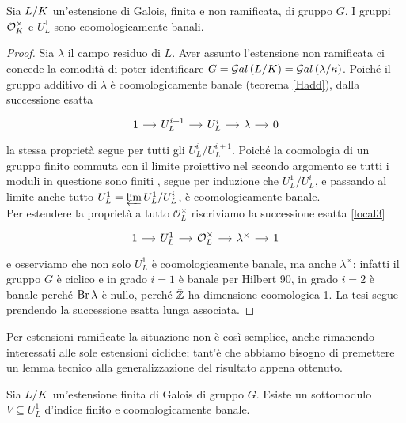 \begin{theorem}
	Sia $ L/K $ un'estensione di Galois, finita e non ramificata, di gruppo $ G $. I gruppi $ \mathcal{O}_{K}^\times $ e $ U_L^1 $ sono coomologicamente banali.
\end{theorem}
\begin{proof}
	Sia $ \lambda $ il campo residuo di $ L $. Aver assunto l'estensione non ramificata ci concede la comodità di poter identificare $ G = \mathcal{G}al\left( L/K \right) = \mathcal{G}al\left( \lambda / \kappa \right) $. Poiché il gruppo additivo di $ \lambda $ è coomologicamente banale (teorema \ref{Hadd}), dalla successione esatta
	\[\begin{tikzcd}[column sep = small]
	1 \rar
	& U_L^{i+1} \rar
	& U_{L}^i \rar
	& \lambda \rar
	& 0
	\end{tikzcd}\]
	la stessa proprietà segue per tutti gli $ U^i_{L} / U^{i+1}_{L} $.
	Poiché la coomologia di un gruppo finito commuta con il limite proiettivo nel secondo argomento se tutti i moduli in questione sono finiti \cite[proposizione 1.12]{Harari}, segue per induzione che $ U^1_{L} / U^{i}_{L} $, e passando al limite anche tutto $ U^1_L = \varprojlim U^1_{L} / U^{i}_{L} $, è coomologicamente banale. \\
	
	Per estendere la proprietà a tutto $ \mathcal{O}_{L}^\times $ riscriviamo la successione esatta \eqref{local3}
	\begin{equation*}
	\begin{tikzcd}[column sep = small]
	1 \rar
	& U_L^{1} \rar
	& \mathcal{O}_{L}^\times \rar
	& \lambda^\times \rar
	&1
	\end{tikzcd}
	\end{equation*}
	e osserviamo che non solo $  U^1_L $ è coomologicamente banale, ma anche $ \lambda^\times $: infatti il gruppo $ G $ è ciclico e in grado $ i = 1 $ è banale per Hilbert 90, in grado $ i = 2 $ è banale perché $ \operatorname{Br} \lambda $ è nullo, perché $ \hat{\mathbb{Z}} $ ha dimensione coomologica 1. La tesi segue prendendo la successione esatta lunga associata.
\end{proof}

Per estensioni ramificate la situazione non è così semplice, anche rimanendo interessati alle sole estensioni cicliche; tant'è che abbiamo bisogno di premettere un lemma tecnico alla generalizzazione del risultato appena ottenuto.

\begin{lemma}
	Sia $ L/K $ un'estensione finita di Galois di gruppo $ G $. Esiste un sottomodulo $ V \subseteq U_L^1 $ d'indice finito e coomologicamente banale.
\end{lemma}

